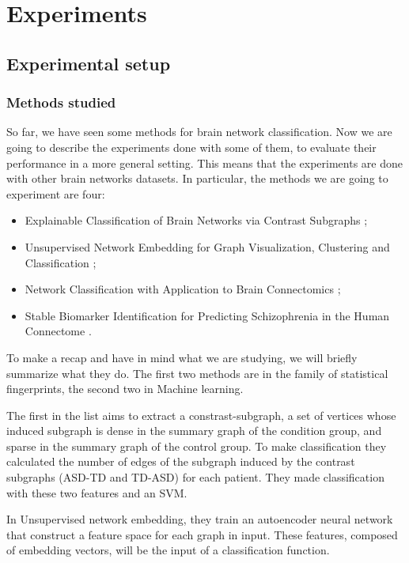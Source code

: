 \chapter{Experiments}
\label{chap:3}
\section{Experimental setup}
\subsection{Methods studied}
So far, we have seen some methods for brain network classification. Now we are going to describe the experiments done with some of them, to evaluate their performance in a more general setting. This means that the experiments are done with other brain networks datasets. In particular, the methods we are going to experiment are four:

\begin{itemize}
	\item Explainable Classification of Brain Networks via Contrast Subgraphs \cite{lanciano2020cs};
	\item Unsupervised Network Embedding for Graph Visualization, Clustering and Classification \cite{GutierrezUn};
	\item Network Classification with Application to Brain Connectomics \cite{Arroyo_Reli_n_2019};
	\item Stable Biomarker Identification for Predicting Schizophrenia in the Human Connectome \cite{GutierrezBio}.
\end{itemize}
To make a recap and have in mind what we are studying, we will briefly summarize what they do. The first two methods are in the family of statistical fingerprints, the second two in Machine learning. 
\vspace{0.5cm}

The first in the list aims to extract a constrast-subgraph, a set of vertices whose induced subgraph is dense in the summary graph of the condition group, and sparse in the summary graph of the control group. To make classification they calculated the number of edges of the subgraph induced by the contrast subgraphs (ASD-TD and TD-ASD) for each patient. They made classification with these two features and an SVM.
\vspace{0.5cm}

In Unsupervised network embedding, they train an autoencoder neural network that construct a feature space for each graph in input. These features, composed of embedding vectors, will be the input of a classification function. 
\vspace{0.5cm}

